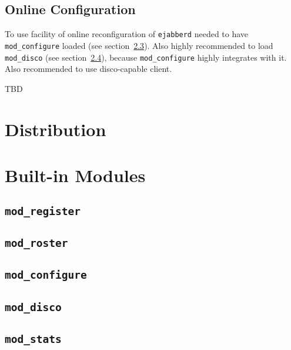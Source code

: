 \documentclass[12pt]{article}
\newcommand{\ejabberd}{\texttt{ejabberd}}
\newcommand{\modregister}{\texttt{mod\_register}}
\newcommand{\modroster}{\texttt{mod\_roster}}
\newcommand{\modconfigure}{\texttt{mod\_configure}}
\newcommand{\moddisco}{\texttt{mod\_disco}}
\newcommand{\modstats}{\texttt{mod\_stats}}
\begin{document}
\subsection{Online Configuration}
\label{sec:onlineconfig}

To use facility of online reconfiguration of \ejabberd{} needed to have
\modconfigure{} loaded (see section~\ref{sec:modconfigure}).  Also highly
recommended to load \moddisco{} (see section~\ref{sec:moddisco}), because
\modconfigure{} highly integrates with it.  Also recommended to use
disco-capable client.

TBD

\section{Distribution}
\label{sec:distribution}





\section{Built-in Modules}
\label{sec:modules}




\subsection{\modregister{}}
\label{sec:modregister}



\subsection{\modroster{}}
\label{sec:modroster}



\subsection{\modconfigure{}}
\label{sec:modconfigure}



\subsection{\moddisco{}}
\label{sec:moddisco}



\subsection{\modstats{}}
\label{sec:modstats}
\end{document}
